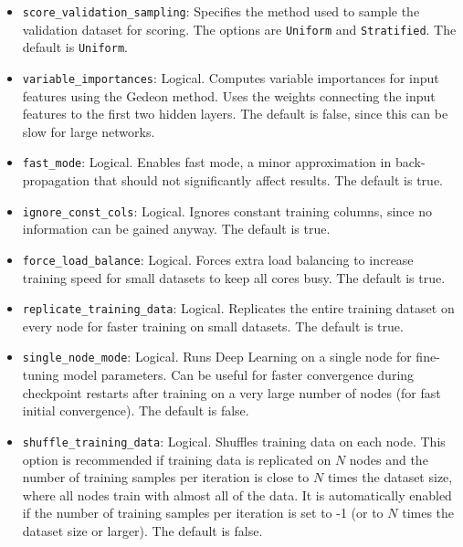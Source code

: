 {{\begin{itemize}
\item \texttt{score\_validation\_sampling}: Specifies the method used to sample the validation dataset for scoring. The options are \texttt{Uniform} and \texttt{Stratified}. The default is \texttt{Uniform}.


\item \texttt{variable\_importances}: Logical. Computes variable importances for input features using the Gedeon method. Uses the weights connecting the input features to the first two hidden layers. The default is false, since this can be slow for large networks. 

\item \texttt{fast\_mode}: Logical. Enables fast mode, a minor approximation in back-propagation that should not significantly affect results. The default is true.

\item \texttt{ignore\_const\_cols}: Logical. Ignores constant training columns, since no information can be gained anyway.  The default is true.

\item \texttt{force\_load\_balance}:  Logical. Forces extra load balancing to increase training speed for small datasets to keep all cores busy. The default is true.

\item \texttt{replicate\_training\_data}:  Logical. Replicates the entire training dataset on every node for faster training on small datasets. The default is true.

\item \texttt{single\_node\_mode}:  Logical. Runs Deep Learning on a single node for fine-tuning model parameters. Can be useful for faster convergence during checkpoint restarts after training on a very large number of nodes (for fast initial convergence). The default is false.

\item \texttt{shuffle\_training\_data}: Logical. Shuffles training data on each node. This option is recommended if training data is replicated on $N$ nodes and the number of training samples per iteration is close to $N$ times the dataset size, where all nodes train with almost all of the data. It is automatically enabled if the number of training samples per iteration is set to -1 (or to $N$ times the dataset size or larger).  The default is false.


\end{itemize}}}
